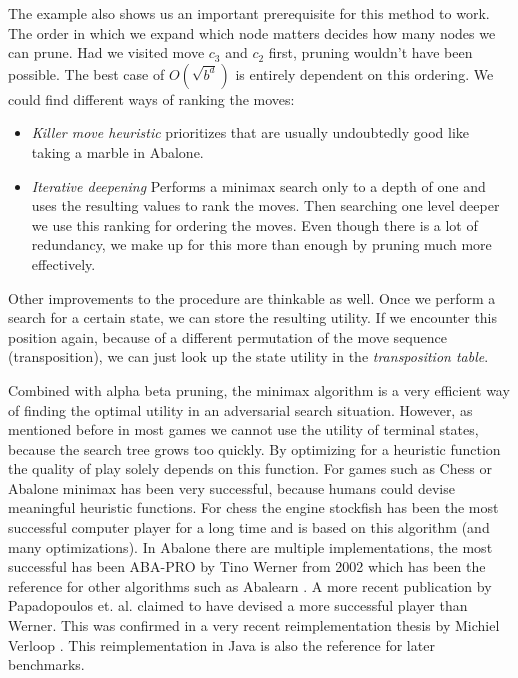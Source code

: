 The example also shows us an important prerequisite for this method to work. The order in which we expand which node matters decides how many nodes we can prune. Had we visited move $ c_3 $ and $ c_2 $ first, pruning wouldn't have been possible. The best case of $ O(\sqrt{b^d}) $ is entirely dependent on this ordering. We could find different ways of ranking the moves:

\begin{itemize}
    \item \textit{Killer move heuristic} prioritizes that are usually undoubtedly good like taking a marble in Abalone.
    \item \textit{Iterative deepening} Performs a minimax search only to a depth of one and uses the resulting values to rank the moves. Then searching one level deeper we use this ranking for ordering the moves. Even though there is a lot of redundancy, we make up for this more than enough by pruning much more effectively.
\end{itemize}

Other improvements to the procedure are thinkable as well. Once we perform a search for a certain state, we can store the resulting utility. If we encounter this position again, because of a different permutation of the move sequence (transposition), we can just look up the state utility in the \textit{transposition table}.

Combined with alpha beta pruning, the minimax algorithm is a very efficient way of finding the optimal utility in an adversarial search situation. However, as mentioned before in most games we cannot use the utility of terminal states, because the search tree grows too quickly. By optimizing for a heuristic function the quality of play solely depends on this function. For games such as Chess or Abalone minimax has been very successful, because humans could devise meaningful heuristic functions. For chess the engine stockfish has been the most successful computer player for a long time and is based on this algorithm (and many optimizations). \cite{noauthor_stockfish_2021, noauthor_stockfish_nodate} In Abalone there are multiple implementations, the most successful has been ABA-PRO by Tino Werner from 2002 \cite{aichholzer_algorithmic_2002} which has been the reference for other algorithms such as Abalearn \cite{campos_abalearn_2003}. A more recent publication by Papadopoulos et. al. claimed to have devised a more successful player than Werner. \cite{papadopoulos_exploring_2012} This was confirmed in a very recent reimplementation thesis by Michiel Verloop \cite{verloop_critical_nodate}. This reimplementation in Java \cite{verloop_abaloneai_nodate} is also the reference for later benchmarks.

